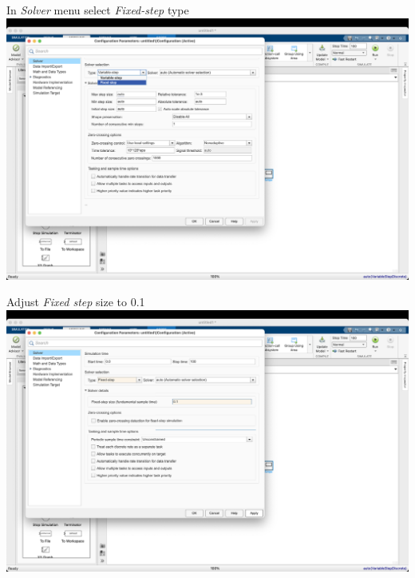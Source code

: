 \begin{frame}{In \textit{Solver} menu select \textit{Fixed-step} type}
    \hspace*{-11mm}
    \includegraphics[width=\paperwidth]{lesson_2/images/simulink_screen_09.png}
\end{frame}

\begin{frame}{Adjust \textit{Fixed step} size to 0.1}
    \hspace*{-11mm}
    \includegraphics[width=\paperwidth]{lesson_2/images/simulink_screen_10.png}
\end{frame}

